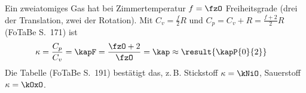 Ein zweiatomiges Gas hat bei Zimmertemperatur $f = \fzO$ Freiheitsgrade (drei der Translation, zwei der Rotation). Mit $C_v = \frac{f}{2}R$ und $C_p = C_v + R = \frac{f+2}{2}R$ (FoTaBe S.~171) ist
\begin{align}
 \kappa &= \frac{C_p}{C_v} = \kapF = \frac{\fzO+2}{\fzO} = \kap \approx \result{\kapP{0}{2}}
\end{align}
Die Tabelle (FoTaBe S.~191) bestätigt das, z.\,B. Stickstoff $\kappa = \kNiO$, Sauerstoff $\kappa = \kOxO$.
